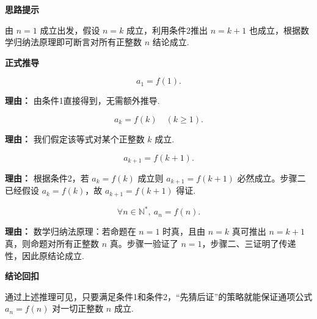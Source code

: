 \begin{proofbox}
	\textbf{\textcolor{CProof}{思路提示}}

	由 $n=1$ 成立出发，假设 $n=k$ 成立，利用条件2推出 $n=k+1$ 也成立，根据数学归纳法原理即可断言对所有正整数 $n$ 结论成立.

	\medskip
	\textbf{\textcolor{CProof}{正式推导}}
	\begin{description}[style=nextline, leftmargin=2.8em, labelsep=0.5em, itemsep=0.55em]
		\item[\textbf{步骤一（验证起点）：}]
			\[
				a_1 = f(1).
			\]
			\par\textbf{理由：} 由条件1直接得到，无需额外推导.

		\item[\textbf{步骤二（归纳假设）：}]
			\[
				a_k = f(k) \quad (k \geq 1).
			\]
			\par\textbf{理由：} 我们假定该等式对某个正整数 $k$ 成立.

		\item[\textbf{步骤三（递推证明）：}]
			\[
				a_{k+1} = f(k+1).
			\]
			\par\textbf{理由：} 根据条件2，若 $a_k = f(k)$ 成立则 $a_{k+1} = f(k+1)$ 必然成立。步骤二已经假设 $a_k = f(k)$，故 $a_{k+1}=f(k+1)$ 得证.

		\item[\textbf{步骤四（归纳原理）：}]
			\[
				\forall n\in\mathbb{N}^*,\ a_n = f(n).
			\]
			\par\textbf{理由：} 数学归纳法原理：若命题在 $n=1$ 时真，且由 $n=k$ 真可推出 $n=k+1$ 真，则命题对所有正整数 $n$ 真。步骤一验证了 $n=1$，步骤二、三证明了传递性，因此原结论成立.
	\end{description}

	\medskip
	\textbf{\textcolor{CProof}{结论回扣}}

	通过上述推理可见，只要满足条件1和条件2，“先猜后证”的策略就能保证通项公式 $a_n=f(n)$ 对一切正整数 $n$ 成立.
\end{proofbox}
